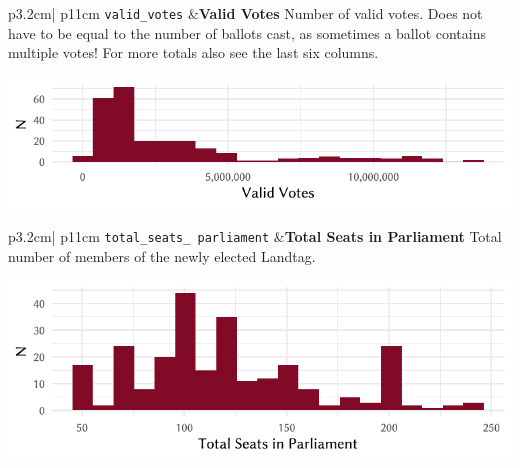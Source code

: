 \documentclass[
]{scrartcl}
\begin{document}
\begin{longtable}{p{3.2cm}| p{11cm}}
\texttt{valid\_votes} &\textbf{Valid Votes}\newline 
Number of valid votes. Does not have to be equal to the number of ballots cast, as sometimes a ballot contains multiple votes! For more totals also see the last six columns.

\hspace*{.25cm}
\begin{minipage}[t]{\linewidth }
\vspace{0pt}
\includegraphics[width = \linewidth]{cbfiles/validvoteplot.pdf}
\end{minipage}


\end{longtable}

\begin{longtable}{p{3.2cm}| p{11cm}}
\texttt{total\_seats\_
parliament} &\textbf{Total Seats in Parliament}\newline 
Total number of members of the newly elected Landtag.

\hspace*{.25cm}
\begin{minipage}[t]{\linewidth }
\vspace{0pt}
\includegraphics[width = \linewidth]{cbfiles/tseatsparlplot.pdf}
\end{minipage}


\end{longtable}
\end{document}
